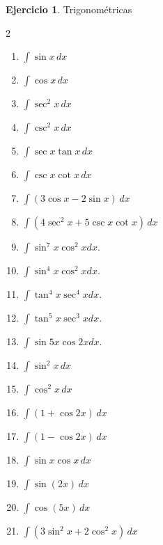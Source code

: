 \documentclass[12pt]{article}
\theoremstyle{definition}
\newtheorem{Ejer}[teorema]{Ejercicio}
\theoremstyle{remark}
\begin{document}
\begin{Ejer} Trigonométricas

\begin{multicols}{2}
\begin{enumerate}[resume=integrales]
\item $\displaystyle \int\sin x\,dx$
\item $\displaystyle \int\cos x\,dx$
\item $\displaystyle \int\sec^2x\,dx$
\item $\displaystyle \int\csc^2x\,dx$
\item $\displaystyle \int\sec x\tan x\,dx$
\item $\displaystyle \int\csc x\cot x\,dx$
\item $\displaystyle \int(3\cos x-2\sin x)\,dx$
\item $\displaystyle \int(4\sec^2x+5\csc x\cot x)\,dx$
\item $\int\sin^7x\cos^2xdx$.
\item $\int\sin^4x\cos^2xdx$.
\item $\int\tan^4x\sec^4xdx$.
\item $\int\tan^5x\sec^3xdx$.
\item $\int\sin5x\cos2xdx$.
\item $\displaystyle \int\sin^2x\,dx$
\item $\displaystyle \int\cos^2x\,dx$
\item $\displaystyle \int(1+\cos 2x)\,dx$
\item $\displaystyle \int(1-\cos 2x)\,dx$
\item $\displaystyle \int\sin x\cos x\,dx$
\item $\displaystyle \int\sin(2x)\,dx$
\item $\displaystyle \int\cos(5x)\,dx$
\item $\displaystyle \int(3\sin^2x+2\cos^2x)\,dx$
\end{enumerate}
\end{multicols}
\end{Ejer}
\end{document}
